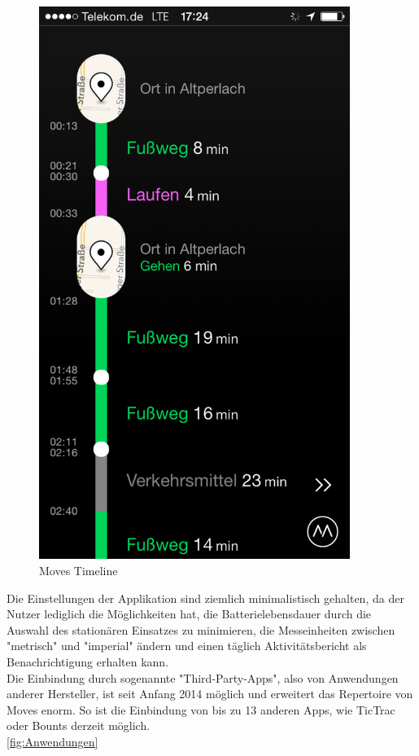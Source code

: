 \begin{figure}
\centering
\includegraphics[width=0.9\textwidth]{images/moves_app_screenshot.png}
\caption{Moves Timeline \cite{fig:Timeline}}
\label{fig:Timeline}
\end{figure}

Die Einstellungen der Applikation sind ziemlich minimalistisch gehalten, da der Nutzer lediglich die Möglichkeiten hat, die Batterielebensdauer durch die Auswahl des stationären Einsatzes zu minimieren, die Messeinheiten zwischen "metrisch" und "imperial" ändern und einen täglich Aktivitätsbericht als Benachrichtigung erhalten kann. 
\\
Die Einbindung durch sogenannte "Third-Party-Apps", also von Anwendungen anderer Hersteller, ist seit Anfang 2014 möglich und erweitert das Repertoire von Moves enorm. 
So ist die Einbindung von bis zu 13 anderen Apps, wie TicTrac oder Bounts derzeit möglich.  
\\
\ref{fig:Anwendungen}

